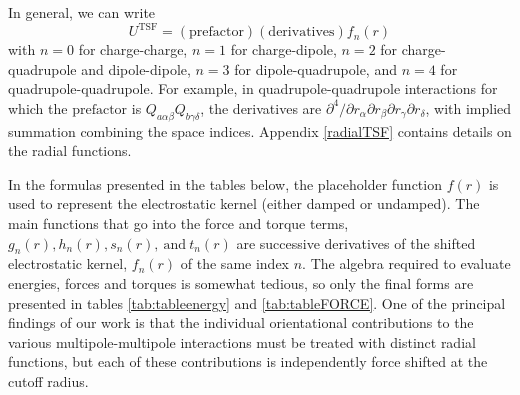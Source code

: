 In general, we can write
%
\begin{equation}
U^{\text{TSF}}= (\text{prefactor}) (\text{derivatives}) f_n(r)
\label{generic}
\end{equation}
%
with $n=0$ for charge-charge, $n=1$ for charge-dipole, $n=2$ for
charge-quadrupole and dipole-dipole, $n=3$ for dipole-quadrupole, and
$n=4$ for quadrupole-quadrupole.  For example, in
quadrupole-quadrupole interactions for which the $\text{prefactor}$ is
$Q_{a \alpha\beta}Q_{b \gamma\delta}$, the derivatives are
$\partial^4/\partial r_\alpha \partial r_\beta \partial
r_\gamma \partial r_\delta$, with implied summation combining the
space indices.  Appendix \ref{radialTSF} contains details on the
radial functions.

In the formulas presented in the tables below, the placeholder
function $f(r)$ is used to represent the electrostatic kernel (either
damped or undamped).  The main functions that go into the force and
torque terms, $g_n(r), h_n(r), s_n(r), \mathrm{~and~} t_n(r)$ are
successive derivatives of the shifted electrostatic kernel, $f_n(r)$
of the same index $n$.  The algebra required to evaluate energies,
forces and torques is somewhat tedious, so only the final forms are
presented in tables \ref{tab:tableenergy} and \ref{tab:tableFORCE}.
One of the principal findings of our work is that the individual
orientational contributions to the various multipole-multipole
interactions must be treated with distinct radial functions, but each
of these contributions is independently force shifted at the cutoff
radius.  
